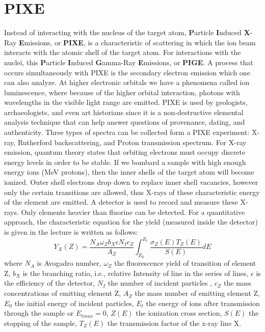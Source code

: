 \section{PIXE}
Instead of interacting with the nucleus of the target atom, \textbf{P}article \textbf{I}nduced \textbf{X}-Ray \textbf{E}missions,  or \textbf{PIXE}, is a characteristic of scattering in which the ion beam interacts with the atomic shell of the target atom.
For interactions with the nuclei, this \textbf{P}article \textbf{I}nduced \textbf{G}amma-Ray \textbf{E}missions, or \textbf{PIGE}.
A process that occurs simultaneously with PIXE is the secondary electron emission which one can also analyze.
At higher electronic orbitals we have a phenomena called ion luminescence, where because of the higher orbital interaction, photons with wavelengths in the visible light range are emitted.
PIXE is used by geologists, archaeologists, and even art historians since it is a non-destructive elemental analysis technique that can help answer questions of provenance, dating, and authenticity.
Three types of spectra can be collected form a PIXE experiment: X-ray, Rutherford backscattering, and Proton transmission spectrum.
For X-ray emission, quantum theory states that orbiting electrons must occupy discrete energy levels in order to be stable.
If we bombard a sample with high enough energy ions (MeV protons), then the inner shells of the target atom will become ionized.
Outer shell electrons drop down to replace inner shell vacancies, however only the certain transitions are allowed, thus X-rays of these characteristic energy of the element are emitted.
A detector is used to record and measure these X-rays.
Only elements heavier than fluorine can be detected.
For a quantitative approach, the characteristic equation for the yield (measured inside the detector) is given in the lecture is written as follows:
\begin{equation}
	Y_X (Z) = \frac{N_A \omega_Z b_X \epsilon N_I c_Z}{A_Z} \int_{E_0}^{E_t} \frac{\sigma_Z (E) T_Z(E)}{S(E)} dE
\end{equation}
where $N_A $ is Avogadro number,
$\omega_Z$ the fluorescence yield of transition of element Z,
$b_X$ is the branching ratio, i.e.,  relative Intensity of line in the series of lines,
$\epsilon$ is the efficiency of the detector,
$N_I$ the number of incident particles ,
$c_Z$ the mass concentrations of emitting element Z,
$A_Z$ the mass number of emitting element Z,
$E_0$ the initial energy of incident particles,
$E_t$ the energy of ions after transmission through the sample or $E_{tmax} = 0$,
$Z(E)$ the ionization cross section,
$S(E)$ the stopping of the sample,
$T_Z(E)$ the transmission factor of the x-ray line X.

